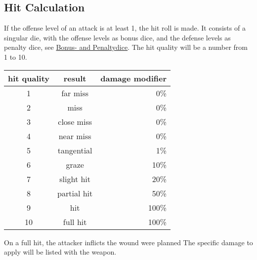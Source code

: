 \subsection{Hit Calculation}\label{subsec:hit}
If the offense level of an attack is at least 1, the hit roll is made.
It consists of a singular die, with the offense levels as bonus dice, and the defense levels as penalty dice,
see \hyperref[sec:bonus--and-penaltydice]{Bonus- and Penaltydice}.
The hit quality will be a number from 1 to 10. \par
\begin{tabular}{c|cr}
    hit quality & result & damage modifier \\\hline
    1 & far miss & 0\%\\
    2 & miss& 0\%\\
    3 & close miss& 0\%\\
    4 & near miss& 0\%\\
    5 & tangential& 1\%\\
    6 & graze& 10\%\\
    7 & slight hit& 20\%\\
    8 & partial hit& 50\%\\
    9 & hit& 100\%\\
    10 & full hit& 100\%\\
\end{tabular}

On a full hit, the attacker inflicts the wound were planned
The specific damage to apply will be listed with the weapon.


